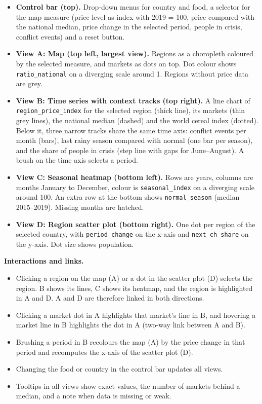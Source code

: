 \documentclass{article}
\begin{document}
\begin{itemize}
  \item \textbf{Control bar (top).} Drop-down menus for country and food, a selector for the map measure (price level as index with 2019 = 100, price compared with the national median, price change in the selected period, people in crisis, conflict events) and a reset button.
  \item \textbf{View A: Map (top left, largest view).} Regions as a choropleth coloured by the selected measure, and markets as dots on top. Dot colour shows \texttt{ratio\_national} on a diverging scale around 1. Regions without price data are grey.
  \item \textbf{View B: Time series with context tracks (top right).} A line chart of \texttt{region\_price\_index} for the selected region (thick line), its markets (thin grey lines), the national median (dashed) and the world cereal index (dotted). Below it, three narrow tracks share the same time axis: conflict events per month (bars), last rainy season compared with normal (one bar per season), and the share of people in crisis (step line with gaps for June--August). A brush on the time axis selects a period.
  \item \textbf{View C: Seasonal heatmap (bottom left).} Rows are years, columns are months January to December, colour is \texttt{seasonal\_index} on a diverging scale around 100. An extra row at the bottom shows \texttt{normal\_season} (median 2015--2019). Missing months are hatched.
  \item \textbf{View D: Region scatter plot (bottom right).} One dot per region of the selected country, with \texttt{period\_change} on the x-axis and \texttt{next\_ch\_share} on the y-axis. Dot size shows population.
\end{itemize}

\textbf{Interactions and links.}
\begin{itemize}
  \item Clicking a region on the map (A) or a dot in the scatter plot (D) selects the region. B shows its lines, C shows its heatmap, and the region is highlighted in A and D. A and D are therefore linked in both directions.
  \item Clicking a market dot in A highlights that market's line in B, and hovering a market line in B highlights the dot in A (two-way link between A and B).
  \item Brushing a period in B recolours the map (A) by the price change in that period and recomputes the x-axis of the scatter plot (D).
  \item Changing the food or country in the control bar updates all views.
  \item Tooltips in all views show exact values, the number of markets behind a median, and a note when data is missing or weak.
\end{itemize}
\end{document}
